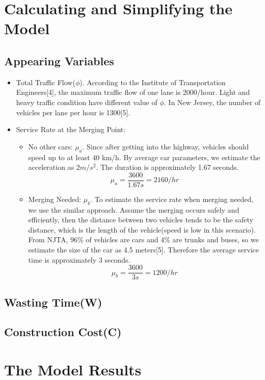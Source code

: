 \section{Calculating and Simplifying the Model}
\subsection{Appearing Variables}
\begin{itemize}
\item Total Traffic Flow($\phi$). According to the Institute of Transportation Engineers[4], the maximum traffic flow of one lane is 2000/hour. Light and heavy traffic condition have different value of $\phi$. In New Jersey, the number of vehicles per lane per hour is 1300[5].
\item Service Rate at the Merging Point:
\begin{itemize}
\item No other cars: $\mu_{a}$. Since after getting into the highway, vehicles should speed up to at least 40 km/h. By average car parameters, we estimate the acceleration as $2m/s^2$. The duration is approximately 1.67 seconds.\\
\[
\mu_{a} = \frac{3600}{1.67 s} = 2160/hr
\]
\item Merging Needed: $\mu_{b}$. To estimate the service rate when merging needed, we use the similar approach. Assume the merging occurs safely and efficiently, then the distance between two vehicles tends to be the safety distance, which is the length of the vehicle(speed is low in this scenario). From NJTA, 96\% of vehicles are cars and 4\% are trunks and buses, so we estimate the size of the car as 4.5 meters[5]. Therefore the average service time is approximately 3 seconds.\\
\[
\mu_{b} = \frac{3600}{3 s} = 1200/hr
\]
\end{itemize}
\end{itemize}

\subsection{Wasting Time(W)}
\subsection{Construction Cost(C)}

\section{The Model Results}

